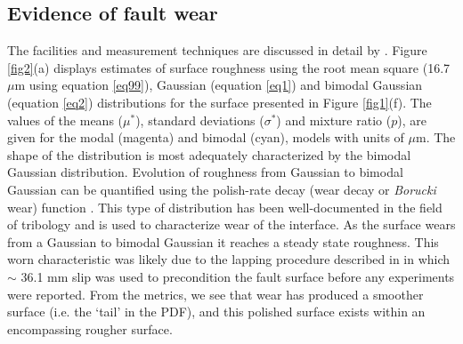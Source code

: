 \documentclass[preprint,1p, 10pt,authoryear]{elsarticle}
\begin{document}
\subsection{Evidence of fault wear}
\label{SurfaceWear}
The facilities and measurement techniques are discussed in detail by \citet{Selvadurai2017}.  Figure \ref{fig2}(a) displays estimates of surface roughness using the root mean square (16.7 $\mu$m using equation \eqref{eq99}), Gaussian (equation \eqref{eq1}) and bimodal Gaussian (equation \eqref{eq2}) distributions for the surface presented in Figure \ref{fig1}(f). The values of the means ($\mu^{*}$), standard deviations ($\sigma^{*}$) and mixture ratio ($p$), are given for the modal (magenta) and bimodal (cyan), models with units of $\mu$m. The shape of the distribution is most adequately characterized by the bimodal Gaussian distribution.  Evolution of roughness from Gaussian to bimodal Gaussian can be quantified using the polish-rate decay (wear decay or \textit{Borucki} wear) function \citep{Adachi2000, Borucki2002, Borucki2004, Ciavarella2016,He2017,Hu2019}. This type of distribution has been well-documented in the field of tribology and is used to characterize wear of the interface. As the surface wears from a Gaussian to bimodal Gaussian it reaches a steady state roughness.  This worn characteristic was likely due to the lapping procedure described in \citet{Selvadurai2015} in which  $\sim$ 36.1 mm slip was used to precondition the fault surface before any experiments were reported. From the metrics, we see that wear has produced a smoother surface (i.e.  the `tail' in the PDF), and this polished surface exists within an encompassing rougher surface.     
\end{document}
